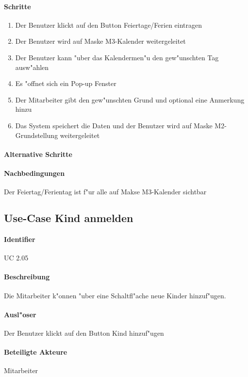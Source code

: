  \paragraph{Schritte}
  \begin{enumerate}
   \item Der Benutzer klickt auf den Button \dq Feiertage/Ferien eintragen\dq
   \item Der Benutzer wird auf Maske M3-Kalender weitergeleitet
   \item Der Benutzer kann "uber das Kalendermen"u den gew"unschten Tag ausw"ahlen
   \item Es "offnet sich ein Pop-up Fenster
   \item Der Mitarbeiter gibt den gew"unschten Grund und optional eine Anmerkung hinzu
   \item Das System speichert die Daten und der Benutzer wird auf Maske M2-Grundstellung weitergeleitet
  \end{enumerate}

  \paragraph{Alternative Schritte}
  \paragraph{Nachbedingungen}
  Der Feiertag/Ferientag ist f"ur alle auf Makse M3-Kalender sichtbar

  
 \newpage
 \subsection{Use-Case Kind anmelden}
  \paragraph{Identifier}
  UC 2.05
  \paragraph{Beschreibung}
    Die Mitarbeiter k"onnen "uber eine Schaltfl"ache neue Kinder hinzuf"ugen.
  \paragraph{Ausl"oser}
    Der Benutzer klickt auf den Button \dq Kind hinzuf"ugen\dq
  \paragraph{Beteiligte Akteure}   \leavevmode \newline
    Mitarbeiter
